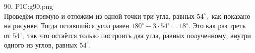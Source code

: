 90. {{PIC:g90.png}}\\Проведём прямую и отложим из одной точки три угла, равных $54^\circ,$ как показано на рисунке. Тогда оставшийся угол равен $180^\circ-3\cdot54^\circ=18^\circ.$ Это как раз треть от $54^\circ,$ так что остаётся только построить два угла, равных полученному, внутри одного из углов, равных $54^\circ.$\\
